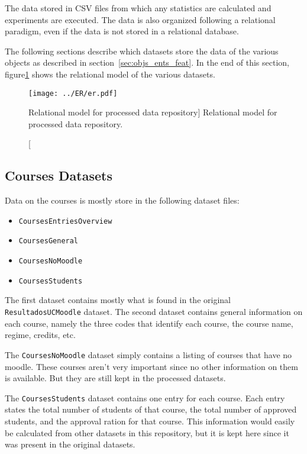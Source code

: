 The data stored in CSV files from which any statistics are calculated and
experiments are executed. The data is also organized following a relational
paradigm, even if the data is not stored in a relational database.

The following sections describe which datasets store the data of the various
objects as described in section~\ref{sec:objs_ents_feat}. In the end of this
section, figure\ref{fig:er} shows the relational model of the various datasets.

\begin{figure}[h!]
    \centering

    \texttt{[image: ../ER/er.pdf]}

    \caption
        [Relational model for processed data repository]
        {Relational model for processed data repository.}

    \label{fig:er}
\end{figure}

\subsection{Courses Datasets}

Data on the courses is mostly store in the following dataset files:

\begin{itemize}
    \item \texttt{CoursesEntriesOverview}
    \item \texttt{CoursesGeneral}
    \item \texttt{CoursesNoMoodle}
    \item \texttt{CoursesStudents}
\end{itemize}

The first dataset contains mostly what is found in the original
\texttt{ResultadosUCMoodle} dataset. The second dataset contains general
information on each course, namely the three codes that identify each course,
the course name, regime, credits, etc.

The \texttt{CoursesNoMoodle} dataset simply contains a listing of courses that
have no moodle. These courses aren't very important since no other information
on them is available. But they are still kept in the processed datasets.

The \texttt{CoursesStudents} dataset contains one entry for each course. Each
entry states the total number of students of that course, the total number of
approved students, and the approval ration for that course. This information
would easily be calculated from other datasets in this repository, but it is
kept here since it was present in the original datasets.


